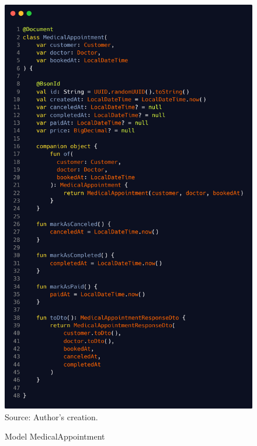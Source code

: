 \begin{figure}[H]
	\centering
	\caption{Model MedicalAppointment}
	\includegraphics[width=0.85\linewidth]{figures/medical_appointment}
	\label{fig:medicalappointment}
	\\ \footnotesize Source: Author's creation.
\end{figure}

